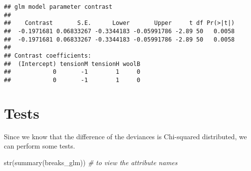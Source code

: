 \documentclass[
  oneside]{book}
\newenvironment{Shaded}{\begin{snugshade}}{\end{snugshade}}
\newcommand{\CommentTok}[1]{\textcolor[rgb]{0.56,0.35,0.01}{\textit{#1}}}
\newcommand{\FunctionTok}[1]{\textcolor[rgb]{0.00,0.00,0.00}{#1}}
\newcommand{\NormalTok}[1]{#1}
\begin{document}
\begin{verbatim}
## glm model parameter contrast
## 
##    Contrast       S.E.      Lower       Upper     t df Pr(>|t|)
##  -0.1971681 0.06833267 -0.3344183 -0.05991786 -2.89 50   0.0058
##  -0.1971681 0.06833267 -0.3344183 -0.05991786 -2.89 50   0.0058
## 
## Contrast coefficients:
##  (Intercept) tensionM tensionH woolB
##            0       -1        1     0
##            0       -1        1     0
\end{verbatim}

\hypertarget{tests}{%
\section{Tests}\label{tests}}

Since we know that the difference of the deviances
is Chi-squared distributed, we can perform some tests.

\begin{Shaded}
\begin{Highlighting}[]
\FunctionTok{str}\NormalTok{(}\FunctionTok{summary}\NormalTok{(breaks\_glm)) }\CommentTok{\# to view the attribute names}
\end{Highlighting}
\end{Shaded}
\end{document}
